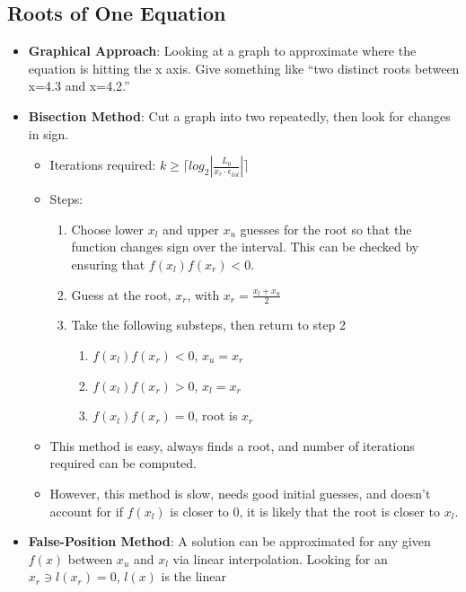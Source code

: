 \documentclass[fontsize=4pt]{scrartcl}
\begin{document}
\begin{multicols}{4}
    \subsection{Roots of One Equation}
      \begin{itemize}
       \item \textbf{Graphical Approach}: Looking at a graph to approximate where the equation is hitting the x axis. Give 
          something like ``two distinct roots between x=4.3 and x=4.2.''
       \item \textbf{Bisection Method}: Cut a graph into two repeatedly, then look for changes in sign.
        \begin{itemize}
          \item Iterations required: $k \geq \lceil log_2|\frac{L_0}{x_r \cdot \epsilon_{tol}}|\rceil$
          \item Steps:
          \begin{enumerate}
              \item Choose lower $x_l$ and upper $x_u$ guesses for the root so that the function changes sign over the
              interval. This can be checked by ensuring that $f(x_l)f(x_r) < 0$.
              \item Guess at the root, $x_r$, with $x_r = \frac{x_l + x_u}{2}$
              \item Take the following substeps, then return to step 2
              \begin{enumerate}
                \item $f(x_l)f(x_r) < 0$, $x_u = x_r$
                \item $f(x_l)f(x_r) > 0$, $x_l = x_r$
                \item $f(x_l)f(x_r) = 0$, root is $x_r$
              \end{enumerate}
          \end{enumerate}
          \item This method is easy, always finds a root, and number of iterations required can be computed.
          \item However, this method is slow, needs good initial guesses, and doesn't account for if $f(x_l)$
            is closer to 0, it is likely that the root is closer to $x_l$.
        \end{itemize}
        \item \textbf{False-Position Method}: A solution can be approximated for any given $f(x)$ between $x_u$
          and $x_l$ via linear interpolation. Looking for an $x_r \ni l(x_r) = 0$, $l(x)$ is the linear

\end{itemize}
\end{multicols}
\end{document}
